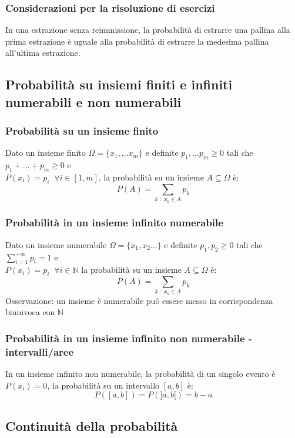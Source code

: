 \documentclass[a4paper]{article}
\begin{document}
\subsubsection*{Considerazioni per la risoluzione di esercizi}
In una estrazione senza reimmissione, la probabilità di estrarre una pallina alla prima estrazione è uguale alla probabilità di
estrarre la medesima pallina all'ultima estrazione.

\newpage

\subsection{Probabilità su insiemi finiti e infiniti numerabili e non numerabili}
\subsubsection*{Probabilità su un insieme finito}
Dato un insieme finito \(\Omega = \{x_1, \dots x_m\}\) e definite \(p_1, \dots p_m \geq 0\) tali che \(p_1 + \dots + p_m \geq 0\) e \\
\(P(x_i) = p_i \;\; \forall i \in [1,m]\), la probabilità su un insieme \(A \subseteq \Omega\) è:
\[P(A) = \sum_{k \; : \; x_k \in A} p_k\]

\subsubsection*{Probabilità in un insieme infinito numerabile}
Dato un insieme numerabile \(\Omega = \{x_1,x_2 \dots\}\) e definite \(p_1,p_2 \geq 0\) tali che \(\sum_{i=1}^{+\infty} p_i = 1\) e \\
\(P(x_i) = p_i \;\; \forall i \in \mathbb{N}\) la probabilità su un insieme \(A \subseteq \Omega\) è:
\[P(A) = \sum_{k \; : \; x_k \in A} p_k\]
Osservazione: un insieme è numerabile può essere messo in corrispondenza biunivoca con \(\mathbb{N}\)

\subsubsection*{Probabilità in un insieme infinito non numerabile - intervalli/aree}
In un insieme infinito non numerabile, la probabilità di un singolo evento è \(P(x_i) = 0\), la probabilità su un intervallo \([a,b]\)
è: \[P([a,b]) = P(]a,b[) = b-a\]

\subsection{Continuità della probabilità}
\end{document}
